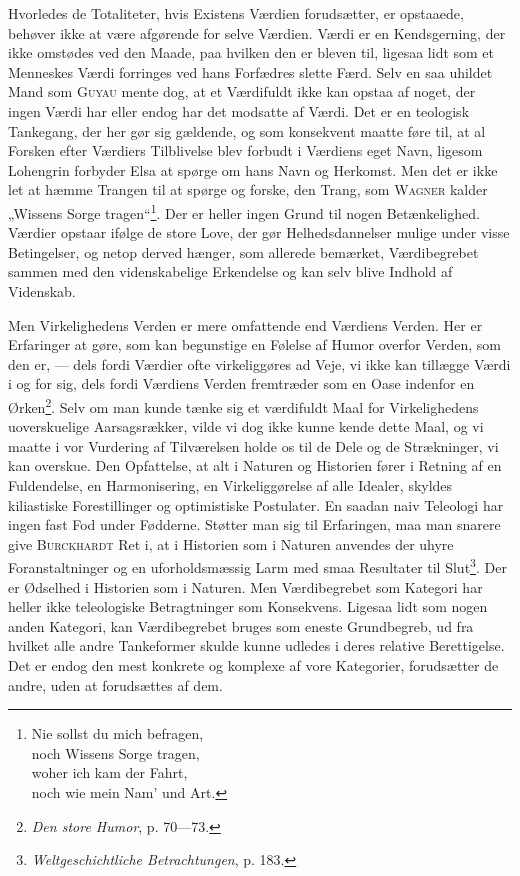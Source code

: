 \documentclass[12pt]{article}
\newcommand{\opage}[1]{\marginnote{\footnotesize\textit{[#1]}}}
\begin{document}
Hvorledes de Totaliteter, hvis Existens Værdien forudsætter, er opstaaede,
behøver ikke at være afgørende for selve Værdien. Værdi er en Kendsgerning, der
ikke omstødes ved den Maade, paa hvilken den er bleven til, ligesaa lidt som et
Menneskes Værdi forringes ved hans Forfædres slette Færd. Selv en saa uhildet
Mand som \textsc{Guyau} mente dog, at et Værdifuldt ikke kan opstaa af noget,
der ingen Værdi har eller endog har det modsatte af Værdi. Det er en teologisk
Tankegang, der her gør sig gældende, og som konsekvent maatte føre til, at al
Forsken efter Værdiers Tilblivelse blev forbudt i Værdiens eget Navn, ligesom
Lohengrin forbyder Elsa at spørge om hans Navn og Herkomst. Men det er ikke let
at hæmme Trangen til at spørge og forske, den Trang, som \textsc{Wagner} kalder
„Wissens Sorge tragen“\footnote{%
Nie sollst du mich befragen,\\
noch Wissens Sorge tragen,\\
woher ich kam der Fahrt,\\
noch wie mein Nam' und Art.}. Der er heller ingen Grund til nogen Betænkelighed.
Værdier opstaar ifølge de store Love, der gør Helhedsdannelser mulige under
visse Betingelser, og netop derved hænger, som allerede bemærket, Værdibegrebet
sammen med den videnskabelige Erkendelse og kan selv blive Indhold af Videnskab.

Men Virkelighedens Verden er mere omfattende end Værdiens Verden. Her er
Erfaringer at gøre, som kan begunstige en Følelse af Humor overfor Verden, som
den er, --- dels fordi Værdier ofte virkeliggøres ad Veje, vi ikke kan tillægge
\setcounter{footnote}{0}%
\opage{73}Værdi i og for sig, dels fordi Værdiens Verden fremtræder som en Oase
indenfor en Ørken\footnote{\textit{Den store Humor}, p. 70---73.}. Selv om man
kunde tænke sig et værdifuldt Maal for Virkelighedens uoverskuelige
Aarsagsrækker, vilde vi dog ikke kunne kende dette Maal, og vi maatte i vor
Vurdering af Tilværelsen holde os til de Dele og de Strækninger, vi kan
overskue. Den Opfattelse, at alt i Naturen og Historien fører i Retning af en
Fuldendelse, en Harmonisering, en Virkeliggørelse af alle Idealer, skyldes
kiliastiske Forestillinger og optimistiske Postulater. En saadan naiv Teleologi
har ingen fast Fod under Fødderne. Støtter man sig til Erfaringen, maa man
snarere give \textsc{Burckhardt} Ret i, at i Historien som i Naturen anvendes
der uhyre Foranstaltninger og en uforholdsmæssig Larm med smaa Resultater til
Slut\footnote{\textit{Weltgeschichtliche Betrachtungen}, p. 183.}. Der er
Ødselhed i Historien som i Naturen. Men Værdibegrebet som Kategori har heller
ikke teleologiske Betragtninger som Konsekvens. Ligesaa lidt som nogen anden
Kategori, kan Værdibegrebet bruges som eneste Grundbegreb, ud fra hvilket alle
andre Tankeformer skulde kunne udledes i deres relative Berettigelse. Det er
endog den mest konkrete og komplexe af vore Kategorier, forudsætter de andre,
uden at forudsættes af dem.
\end{document}

